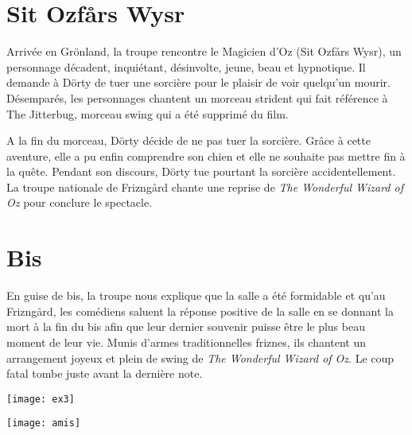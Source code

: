 \documentclass[a4paper]{article}
\newcommand{\mssection}[1]{\section{#1}}
\begin{document}
\mssection{Sit Ozfårs Wysr}
Arrivée en Grönland, la troupe rencontre le Magicien d'Oz (Sit Ozfårs Wysr), un personnage
décadent, inquiétant, désinvolte, jeune, beau et hypnotique. Il
demande à Dörty de tuer une sorcière pour le plaisir de voir quelqu'un
mourir. Désemparés, les personnages chantent un morceau strident qui fait
référence à \og{}The Jitterbug\fg{}, morceau swing qui a été supprimé du
film.\par
A la fin du morceau, Dörty décide de ne pas tuer la sorcière. Grâce à cette
aventure, elle a pu enfin comprendre son chien et elle ne souhaite pas
mettre fin à la quête. Pendant son discours, Dörty tue pourtant la
sorcière accidentellement. La troupe nationale de Frizngård chante une reprise de \emph{The
Wonderful Wizard of Oz} pour conclure le spectacle.\par
\mssection{Bis}
En guise de bis, la troupe nous explique que la salle a été formidable et
qu'au Frizngård, les comédiens saluent la réponse positive de la salle en
se donnant la mort à la fin du bis afin que leur dernier souvenir puisse être le plus beau
moment de leur vie. Munis d'armes traditionnelles friznes, ils chantent un arrangement joyeux et plein de swing de \emph{The
Wonderful Wizard of Oz}. Le coup fatal tombe juste avant la dernière note.\\
\begin{center}
\texttt{[image: ex3]}
\end{center}

\begin{center}
\texttt{[image: amis]}
\end{center}
\end{document}
